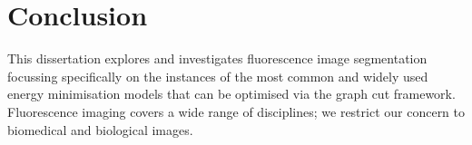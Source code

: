 
\chapter{Conclusion} %

\label{chap:Chapter7} %



This dissertation explores and investigates fluorescence image segmentation focussing specifically on the instances of the most common and widely used energy minimisation models that can be optimised via the graph cut framework. Fluorescence imaging covers a wide range of disciplines; we restrict our concern to biomedical and biological images.

